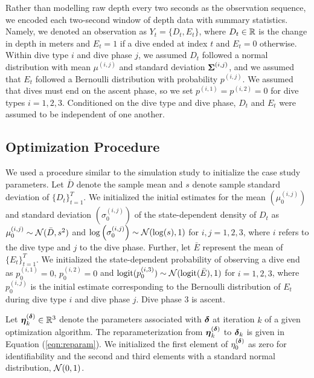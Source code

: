 Rather than modelling raw depth every two seconds as the observation sequence, we encoded each two-second window of depth data with summary statistics. Namely, we denoted an observation as $Y_t = \{D_t,E_t\}$, where $D_t \in \mathbb{R}$ is the change in depth in meters and $E_t = 1$ if a dive ended at index $t$ and $E_t = 0$ otherwise. 
Within dive type $i$ and dive phase $j$, we assumed $D_t$ followed a normal distribution with mean $\mu^{(i,j)}$ and standard deviation $\boldsymbol{\Sigma}^{(i,j)}$, and we assumed that $E_t$ followed a Bernoulli distribution with probability $p^{(i,j)}$. We assumed that dives must end on the ascent phase, so we set $p^{(i,1)} = p^{(i,2)} = 0$ for dive types $i = 1,2,3$. Conditioned on the dive type and dive phase, $D_t$ and $E_t$ were assumed to be independent of one another.

\subsection{Optimization Procedure}

We used a procedure similar to the simulation study to initialize the case study parameters. Let $\bar D$ denote the sample mean and $s$ denote sample standard deviation of $\{D_t\}_{t=1}^T$. We initialized the initial estimates for the mean $\left(\mu^{(i,j)}_0\right)$ and standard deviation $\left(\sigma^{(i,j)}_0\right)$ of the state-dependent density of $D_t$ as
%
    $\mu^{(i,j)}_0 \sim \mathcal{N}(\bar D, s^2)$ and $\log\left(\sigma^{(i,j)}_0\right) \sim \mathcal{N}(\log(s),1)$ for $i,j = 1,2,3$,
%
where $i$ refers to the dive type and $j$ to the dive phase. Further, let $\bar E$ represent the mean of $\{E_t\}_{t=1}^T$. We initialized the state-dependent probability of observing a dive end as
%
    $p^{(i,1)}_0 = 0$, $p^{(i,2)}_0 = 0$ and $\operatorname*{logit}(p^{(i,3)}_0) \sim \mathcal{N}(\operatorname*{logit}(\bar E),1)$ for $i = 1,2,3$,
%
where $p^{(i,j)}_0$ is the initial estimate corresponding to the Bernoulli distribution of $E_t$ during dive type $i$ and dive phase $j$. Dive phase 3 is ascent.

Let $\boldsymbol{\eta}^{(\boldsymbol{\delta})}_k \in \mathbb{R}^3$ denote the parameters associated with $\boldsymbol{\delta}$ at iteration $k$ of a given optimization algorithm. The reparameterization from $\boldsymbol{\eta}^{(\boldsymbol{\delta})}_k$ to $\boldsymbol{\delta}_k$ is given in Equation (\ref{eqn:reparam}). We initialized the first element of $\eta^{(\boldsymbol{\delta})}_0$ as zero for identifiability and the second and third elements with a standard normal distribution, $\mathcal{N}(0,1)$.

